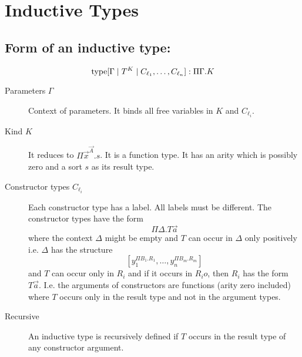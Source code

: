 \section {Inductive Types}


\subsection{Form of an inductive type:}
$$
    {\text{type}}[\Gamma \mid T^K \mid C_{\ell_1}, \ldots, C_{\ell_n}] : \Pi \Gamma. K
$$

\begin{description}
    \item [Parameters $\Gamma$] Context of parameters. It binds all free
        variables in $K$ and $C_{\ell_i}$.

    \item [Kind $K$] It reduces to $\Pi \vec x^{\vec A}. s$. It is a function
        type. It has an arity which is possibly zero and a sort $s$ as its
        result type.

    \item [Constructor types $C_{\ell_i}$] Each constructor type has a label.
        All labels must be different. The constructor types have the form
        $$
            \Pi \Delta. T \vec a
        $$
        where the context $\Delta$ might be empty and $T$ can occur in $\Delta$
        only positively i.e. $\Delta$ has the structure
        $$
            [y_1^{\Pi B_1. R_1}, \ldots, y_n^{\Pi B_m. R_m}]
        $$
        and $T$ can occur only in $R_i$ and if it occurs in $R_io$, then $R_i$
        has the form $T \vec a$. I.e. the arguments of constructors are
        functions (arity zero included) where $T$ occurs only in the result type
        and not in the argument types.

    \item [Recursive]
        An inductive type is recursively defined if $T$ occurs in the result
        type of any constructor argument.
\end{description}



